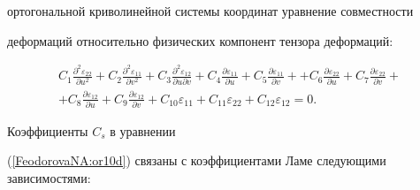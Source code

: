 ортогональной криволинейной системы координат уравнение совместности

 деформаций относительно физических компонент тензора деформаций:

\begin{multline}

\label{FeodorovaNA:or10d}

 C_1\frac{\partial^2\varepsilon_{22}}{\partial u^2}+

C_2\frac{\partial^2\varepsilon_{11}}{\partial

v^2}+C_3\frac{\partial^2\varepsilon_{12}}{\partial u\partial v}+

C_4\frac{\partial \varepsilon_{11}}{\partial u}+ C_5\frac{\partial

\varepsilon_{11}}{\partial v}+

 +C_6\frac{\partial \varepsilon_{22}}{\partial u}+

C_7\frac{\partial \varepsilon_{22}}{\partial v} +\\

+C_8\frac{\partial

\varepsilon_{12}}{\partial u}+C_9\frac{\partial \varepsilon_{12}}{\partial v}+

C_{10}\varepsilon_{11}+C_{11}\varepsilon_{22}+C_{12}\varepsilon_{12}=0.

\end{multline}

Коэффициенты $C_{s}$ в уравнении

(\ref{FeodorovaNA:or10d}) связаны с коэффициентами Ламе следующими зависимостями:


